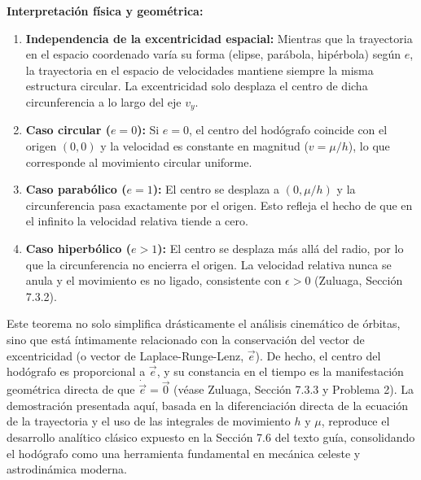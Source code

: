 \documentclass[12pt, a4paper]{article}
\begin{document}
\textbf{Interpretación física y geométrica:}
\begin{enumerate}
    \item \textbf{Independencia de la excentricidad espacial:} Mientras que la trayectoria en el espacio coordenado varía su forma (elipse, parábola, hipérbola) según $e$, la trayectoria en el espacio de velocidades mantiene siempre la misma estructura circular. La excentricidad solo desplaza el centro de dicha circunferencia a lo largo del eje $v_y$.
    \item \textbf{Caso circular ($e=0$):} Si $e=0$, el centro del hodógrafo coincide con el origen $(0,0)$ y la velocidad es constante en magnitud ($v = \mu/h$), lo que corresponde al movimiento circular uniforme.
    \item \textbf{Caso parabólico ($e=1$):} El centro se desplaza a $(0, \mu/h)$ y la circunferencia pasa exactamente por el origen. Esto refleja el hecho de que en el infinito la velocidad relativa tiende a cero.
    \item \textbf{Caso hiperbólico ($e>1$):} El centro se desplaza más allá del radio, por lo que la circunferencia no encierra el origen. La velocidad relativa nunca se anula y el movimiento es no ligado, consistente con $\epsilon > 0$ (Zuluaga, Sección 7.3.2).
\end{enumerate}

Este teorema no solo simplifica drásticamente el análisis cinemático de órbitas, sino que está íntimamente relacionado con la conservación del vector de excentricidad (o vector de Laplace-Runge-Lenz, $\vec{e}$). De hecho, el centro del hodógrafo es proporcional a $\vec{e}$, y su constancia en el tiempo es la manifestación geométrica directa de que $\dot{\vec{e}} = \vec{0}$ (véase Zuluaga, Sección 7.3.3 y Problema 2). La demostración presentada aquí, basada en la diferenciación directa de la ecuación de la trayectoria y el uso de las integrales de movimiento $h$ y $\mu$, reproduce el desarrollo analítico clásico expuesto en la Sección 7.6 del texto guía, consolidando el hodógrafo como una herramienta fundamental en mecánica celeste y astrodinámica moderna.
\end{document}
